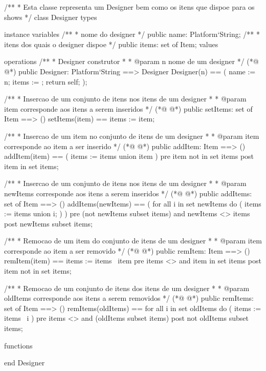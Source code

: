 \begin{vdmpp}[breaklines=true]
/**
* Esta classe representa um Designer bem como os itens que dispoe para os shows
*/
class Designer
types

instance variables
  /**
  * nome do designer
  */
  public name: Platform`String;
  /**
  * itens dos quais o designer dispoe
  */
  public items: set of Item;
values
 
operations
 /**
 * Designer construtor
 * 
 * @param n nome de um designer
 */
(*@
\label{Designer:24}
@*)
 public Designer: Platform`String ==> Designer 
  Designer(n) == (
   name := n;
   items := {};
   return self;
 );
 
 /**
 * Insercao de um conjunto de itens nos itens de um designer
 * 
 * @param item corresponde aos itens a serem inseridos
 */
(*@
\label{setItems:36}
@*)
 public setItems: set of Item ==> ()
   setItems(item) == 
    items := item;
    
 /**
 * Insercao de um item no conjunto de itens de um designer
 * 
 * @param item corresponde ao item a ser inserido
 */
(*@
\label{addItem:45}
@*)
 public addItem: Item ==> ()
  addItem(item) == (
     items := items union {item}
  )
 pre item not in set items
 post item in set items;
 
 /**
 * Insercao de um conjunto de itens nos itens de um designer
 * 
 * @param newItems corresponde aos itens a serem inseridos
 */
(*@
\label{addItems:57}
@*)
 public addItems: set of Item ==> ()
  addItems(newItems) == (
    for all i in set newItems do (
      items := items union {i};
    )
   )
 pre (not newItems subset items) and newItems <> items
 post newItems subset items;
   
  /**
 * Remocao de um item do conjunto de itens de um designer
 * 
 * @param item corresponde ao item a ser removido
 */
(*@
\label{remItem:71}
@*)
 public remItem: Item ==> ()
  remItem(item) ==
      items := items \ {item}
 pre items <> {} and item in set items
 post item not in set items;
  
 /**
 * Remocao de um conjunto de itens dos itens de um designer
 * 
 * @param oldItems corresponde aos itens a serem removidos
 */
(*@
\label{remItems:82}
@*)
 public remItems: set of Item ==> ()
  remItems(oldItems) ==
    for all i in set oldItems do (
      items := items \ {i}
    )
 pre items <> {} and (oldItems subset items)
 post not oldItems subset items;
  
functions

end Designer

\end{vdmpp}

